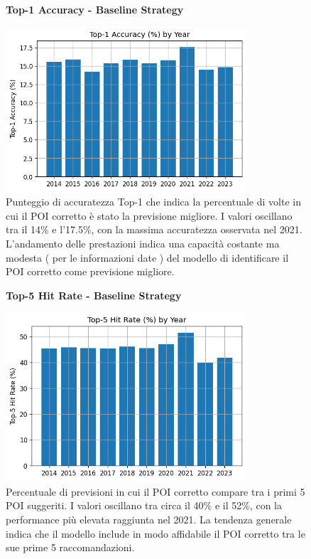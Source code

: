 \begin{itemize}
\begin{enumerate}
\begin{figure}[H]
\centering
\textbf{Top-1 Accuracy - Baseline Strategy}\par
\vspace{0.5em}
\includegraphics[width=0.8\textwidth]{../../img/SPACE-GEO_n-1_come_current_POI/top_1_accuracy.png}
\caption{Punteggio di accuratezza Top-1 che indica la percentuale di volte in cui il POI corretto è stato la previsione migliore. I valori oscillano tra il 14\% e l'17.5\%, con la massima accuratezza osservata nel 2021. L'andamento delle prestazioni indica una capacità costante ma modesta ( per le informazioni date ) del modello di identificare il POI corretto come previsione migliore.}
\label{fig:baseline_top1}
\end{figure}

\begin{figure}[H]
\centering
\textbf{Top-5 Hit Rate - Baseline Strategy}\par
\vspace{0.5em}
\includegraphics[width=0.8\textwidth]{../../img/SPACE-GEO_n-1_come_current_POI/top_5_hit_rate.png}
\caption{Percentuale di previsioni in cui il POI corretto compare tra i primi 5 POI suggeriti. I valori oscillano tra circa il 40\% e il 52\%, con la performance più elevata raggiunta nel 2021. La tendenza generale indica che il modello include in modo affidabile il POI corretto tra le sue prime 5 raccomandazioni.}
\label{fig:baseline_top5}
\end{figure}


\end{enumerate}
\end{itemize}
